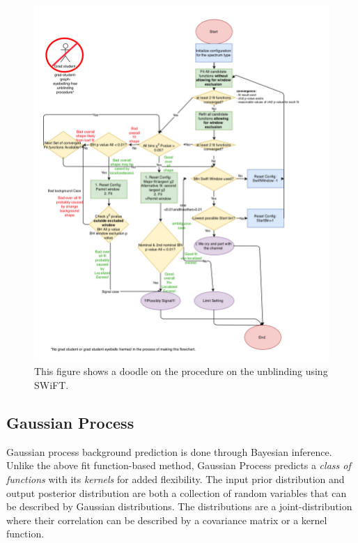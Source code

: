 \begin{figure}[!htb] \begin{center}
        \includegraphics[width=1.05\textwidth]{figures/chapter_analysismethod/swift_unblindingflowchart}
        \caption{
            This figure shows a doodle on the procedure on the unblinding using SWiFT.
        }
        \label{fig:unblinding}
    \end{center}
\end{figure}
\FloatBarrier
    
    \subsection{Gaussian Process} 
    \label{sec:GP}

    Gaussian process background prediction is done through Bayesian inference. Unlike the above fit function-based method, Gaussian Process predicts a \textit{class of functions} with its \textit{kernels} for added flexibility. The input prior distribution and output posterior distribution are both a collection of random variables that can be described by Gaussian distributions. The distributions are a joint-distribution where their correlation can be described by a covariance matrix or a kernel function. 

